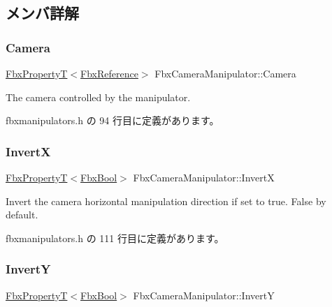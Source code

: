 \subsection{メンバ詳解}
\mbox{\label{class_fbx_camera_manipulator_a3914094466ec766c18c0e544431e8060}} 
\subsubsection{\texorpdfstring{Camera}{Camera}}
{\footnotesize\ttfamily \hyperlink{class_fbx_property_t}{Fbx\+PropertyT}$<$\hyperlink{fbxtypes_8h_a44df6a2eec915cf27cd481e5c5e48a24}{Fbx\+Reference}$>$ Fbx\+Camera\+Manipulator\+::\+Camera}

The camera controlled by the manipulator. 

 fbxmanipulators.\+h の 94 行目に定義があります。

\mbox{\label{class_fbx_camera_manipulator_aebb2e55534a051995499d73cd1742511}} 
\subsubsection{\texorpdfstring{InvertX}{InvertX}}
{\footnotesize\ttfamily \hyperlink{class_fbx_property_t}{Fbx\+PropertyT}$<$\hyperlink{fbxtypes_8h_a92e0562b2fe33e76a242f498b362262e}{Fbx\+Bool}$>$ Fbx\+Camera\+Manipulator\+::\+InvertX}

Invert the camera horizontal manipulation direction if set to true. False by default. 

 fbxmanipulators.\+h の 111 行目に定義があります。

\mbox{\label{class_fbx_camera_manipulator_a9e9a2e653b6ef9f1d3da31110f26fec3}} 
\subsubsection{\texorpdfstring{InvertY}{InvertY}}
{\footnotesize\ttfamily \hyperlink{class_fbx_property_t}{Fbx\+PropertyT}$<$\hyperlink{fbxtypes_8h_a92e0562b2fe33e76a242f498b362262e}{Fbx\+Bool}$>$ Fbx\+Camera\+Manipulator\+::\+InvertY}

